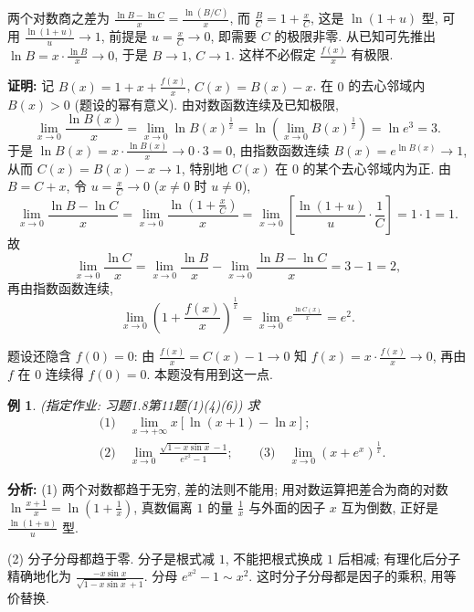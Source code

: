 \documentclass[UTF8,openany]{ctexbook}
\theoremstyle{chinesetextbook}
\newtheorem{example}{例}[section]
\newenvironment{cnproof}{\par\indent\textbf{证明:} \ignorespaces}{\par}
\begin{document}
两个对数商之差为 $\displaystyle\frac{\ln B-\ln C}x=\frac{\ln(B/C)}x$, 而 $\displaystyle\frac BC=1+\frac xC$, 这是 $\ln(1+u)$ 型, 可用 $\displaystyle\frac{\ln(1+u)}u\to1$, 前提是 $u=\frac xC\to0$, 即需要 $C$ 的极限非零. 从已知可先推出 $\ln B=x\cdot\frac{\ln B}x\to0$, 于是 $B\to1$, $C\to1$. 这样不必假定 $\displaystyle\frac{f(x)}x$ 有极限.
\begin{cnproof}
记 $\displaystyle B(x)=1+x+\frac{f(x)}x$, $C(x)=B(x)-x$. 在 $0$ 的去心邻域内 $B(x)>0$ (题设的幂有意义). 由对数函数连续及已知极限,
\[
\lim_{x\to0}\frac{\ln B(x)}x=\lim_{x\to0}\ln B(x)^{\frac1x}=\ln\left(\lim_{x\to0}B(x)^{\frac1x}\right)=\ln e^3=3.
\]
于是 $\displaystyle\ln B(x)=x\cdot\frac{\ln B(x)}x\to0\cdot3=0$, 由指数函数连续 $B(x)=e^{\ln B(x)}\to1$, 从而 $C(x)=B(x)-x\to1$, 特别地 $C(x)$ 在 $0$ 的某个去心邻域内为正. 由 $B=C+x$, 令 $\displaystyle u=\frac xC\to0$ ($x\ne0$ 时 $u\ne0$),
\[
\lim_{x\to0}\frac{\ln B-\ln C}{x}
=\lim_{x\to0}\frac{\ln\left(1+\frac xC\right)}{x}
=\lim_{x\to0}\left[\frac{\ln(1+u)}{u}\cdot\frac1C\right]
=1\cdot1=1.
\]
故
\[
\lim_{x\to0}\frac{\ln C}x
=\lim_{x\to0}\frac{\ln B}x-\lim_{x\to0}\frac{\ln B-\ln C}x=3-1=2,
\]
再由指数函数连续,
\[
\lim_{x\to0}\left(1+\frac{f(x)}x\right)^{\frac1x}
=\lim_{x\to0}e^{\frac{\ln C(x)}x}=e^{2}.
\]
\end{cnproof}
题设还隐含 $f(0)=0$: 由 $\displaystyle\frac{f(x)}x=C(x)-1\to0$ 知 $f(x)=x\cdot\frac{f(x)}x\to0$, 再由 $f$ 在 $0$ 连续得 $f(0)=0$. 本题没有用到这一点.
\begin{example}
\textnormal{(指定作业: 习题1.8第11题(1)(4)(6))} 求
\[
\begin{aligned}
&\text{(1)}\quad \lim_{x\to+\infty}x\left[\ln(x+1)-\ln x\right];\\
&\text{(2)}\quad \lim_{x\to0}\frac{\sqrt{1-x\sin x}-1}{e^{x^2}-1};\qquad
\text{(3)}\quad \lim_{x\to0}\left(x+e^x\right)^{\frac1x}.
\end{aligned}
\]
\end{example}
\par\indent\textbf{分析:} (1) 两个对数都趋于无穷, 差的法则不能用; 用对数运算把差合为商的对数 $\displaystyle\ln\frac{x+1}x=\ln\left(1+\frac1x\right)$, 真数偏离 $1$ 的量 $\displaystyle\frac1x$ 与外面的因子 $x$ 互为倒数, 正好是 $\displaystyle\frac{\ln(1+u)}u$ 型.

(2) 分子分母都趋于零. 分子是根式减 $1$, 不能把根式换成 $1$ 后相减; 有理化后分子精确地化为 $\displaystyle\frac{-x\sin x}{\sqrt{1-x\sin x}+1}$. 分母 $e^{x^2}-1\sim x^2$. 这时分子分母都是因子的乘积, 用等价替换.
\end{document}
